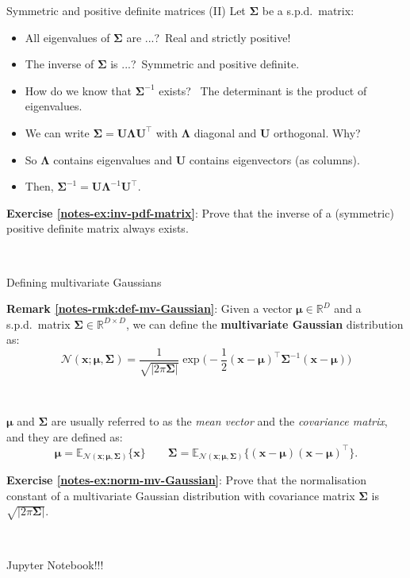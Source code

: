 \documentclass{beamer}
\newcommand{\bs}[1]{\boldsymbol{#1}}
\newcommand{\exercise}[2]{\noindent\colorbox{blue!10}{\parbox{0.995\textwidth}{\textbf{Exercise \ref{notes-ex:#1}}: #2}}\\}
\newcommand{\remark}[2]{\noindent\colorbox{red!10}{\parbox{0.995\textwidth}{\textbf{Remark \ref{notes-rmk:#1}}: #2}}\\}
\begin{document}
\begin{frame}{Symmetric and positive definite matrices (II)}
    Let $\bs{\Sigma}$ be a s.p.d.\ matrix:
    \begin{itemize}
        \item All eigenvalues of $\bs{\Sigma}$ are ...?\pause\ Real and \pause strictly positive!
        \item The inverse of $\bs{\Sigma}$ is ...?\pause\ Symmetric and positive definite.
        \item How do we know that $\bs{\Sigma}^{-1}$ exists? \pause\ The determinant is the product of eigenvalues.
        \item We can write $\bs{\Sigma}=\bs{U}\bs{\Lambda}\bs{U}^\top$ with $\bs{\Lambda}$ diagonal and $\bs{U}$ orthogonal. Why?\pause
        \item So $\bs{\Lambda}$ contains eigenvalues and $\bs{U}$ contains eigenvectors (as columns).\pause
        \item Then, $\bs{\Sigma}^{-1} = \bs{U}\bs{\Lambda}^{-1}\bs{U}^\top$.
    \end{itemize}\vspace{3mm}
    \exercise{inv-pdf-matrix}{Prove that the inverse of a (symmetric) positive definite matrix always exists.}
\end{frame}
 
\begin{frame}{Defining multivariate Gaussians}

\remark{def-mv-Gaussian}{Given a vector $\bs{\mu}\in\mathbb{R}^D$ and a s.p.d.\ matrix $\bs{\Sigma}\in\mathbb{R}^{D\times D}$, we can define the \textbf{multivariate Gaussian} distribution as:
\[
\mathcal{N}(\bs{x};\bs{\mu},\bs{\Sigma}) = \frac{1}{\sqrt{|2\pi\bs{\Sigma}|}}\exp\Big(-\frac{1}{2}(\bs{x}-\bs{\mu})^\top\bs{\Sigma}^{-1}(\bs{x}-\bs{\mu})\Big)
\]
}\vspace{3mm}

$\bs{\mu}$ and $\bs{\Sigma}$ are usually referred to as the \textit{mean vector} and the \textit{covariance matrix}, and they are defined as:
\[
\bs{\mu} = \mathbb{E}_{\mathcal{N}(\bs{x};\bs{\mu},\bs{\Sigma})}\{\mathbf{x}\} \qquad \bs{\Sigma} = \mathbb{E}_{\mathcal{N}(\bs{x};\bs{\mu},\bs{\Sigma})}\{(\mathbf{x}-\bs{\mu})(\mathbf{x}-\bs{\mu})^\top\}.
\]

\exercise{norm-mv-Gaussian}{Prove that the normalisation constant of a multivariate Gaussian distribution with covariance matrix $\bs{\Sigma}$ is $\sqrt{|2\pi\bs{\Sigma}|}$.}\vspace{3mm}
    
Jupyter Notebook!!!
\end{frame}
\end{document}
